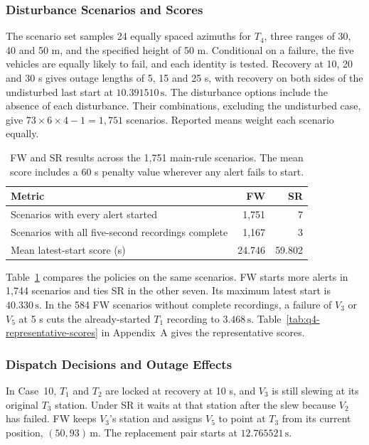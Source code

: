 \documentclass{swmcmthesis}
\begin{document}
\subsubsection{Disturbance Scenarios and Scores}

The scenario set samples 24 equally spaced azimuths for \(T_4\), three ranges of 30, 40 and 50 m, and the specified height of 50 m. Conditional on a failure, the five vehicles are equally likely to fail, and each identity is tested. Recovery at 10, 20 and 30 s gives outage lengths of 5, 15 and 25 s, with recovery on both sides of the undisturbed last start at \(10.391510\,\mathrm s\). The disturbance options include the absence of each disturbance. Their combinations, excluding the undisturbed case, give \(73\times6\times4-1=1{,}751\) scenarios. Reported means weight each scenario equally.

\begin{table}[!htbp]
    \centering
    \caption{FW and SR results across the 1,751 main-rule scenarios. The mean score includes a 60 s penalty value wherever any alert fails to start.}
    \label{tab:q4-main-scores}
    \begin{tabular}{@{}lrr@{}}
        \toprule
        Metric & FW & SR \\
        \midrule
        Scenarios with every alert started & 1,751 & 7 \\
        Scenarios with all five-second recordings complete & 1,167 & 3 \\
        Mean latest-start score (s) & 24.746 & 59.802 \\
        \bottomrule
    \end{tabular}
\end{table}

Table~\ref{tab:q4-main-scores} compares the policies on the same scenarios. FW starts more alerts in 1,744 scenarios and ties SR in the other seven. Its maximum latest start is \(40.330\,\mathrm s\). In the 584 FW scenarios without complete recordings, a failure of \(V_3\) or \(V_5\) at 5 s cuts the already-started \(T_1\) recording to \(3.468\,\mathrm s\). Table~\ref{tab:q4-representative-scores} in Appendix~A gives the representative scores.

\subsubsection{Dispatch Decisions and Outage Effects}
\label{sec:q4-dispatch-effects}

In Case~10, \(T_1\) and \(T_2\) are locked at recovery at 10 s, and \(V_3\) is still slewing at its original \(T_3\) station. Under SR it waits at that station after the slew because \(V_2\) has failed. FW keeps \(V_3\)'s station and assigns \(V_5\) to point at \(T_3\) from its current position, \((50,93)\,\mathrm m\). The replacement pair starts at \(12.765521\,\mathrm s\).
\end{document}
